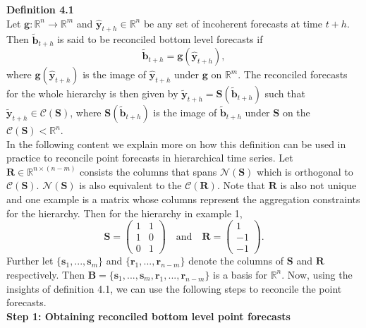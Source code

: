 \documentclass[a4paper, 11pt]{article}
\begin{document}
\noindent
\textbf{Definition 4.1}\\
\noindent
Let $\bm{g}:\bm{\mathbb{R}}^n \rightarrow \bm{\mathbb{R}}^m $ and $\hat{\bm{y}}_{t+h} \in \bm{\mathbb{R}}^n$ be any set of incoherent forecasts at time $t+h$. Then $\tilde{\bm{b}}_{t+h}$ is said to be reconciled bottom level forecasts if 
\begin{equation}
\tilde{\bm{b}}_{t+h}=\bm{g}(\hat{\bm{y}}_{t+h}),
\end{equation}
\noindent
where $\bm{g}(\hat{\bm{y}}_{t+h})$ is the image of $\hat{\bm{y}}_{t+h}$ under $\bm{g}$ on $\bm{\mathbb{R}}^m$. The reconciled forecasts for the whole hierarchy is then given by $\tilde{\bm{y}}_{t+h}=\bm{S}(\tilde{\bm{b}}_{t+h})$ such that $\tilde{\bm{y}}_{t+h} \in \mathscr{C}(\bm{S})$, where $\bm{S}(\tilde{\bm{b}}_{t+h})$ is the image of $\tilde{\bm{b}}_{t+h}$ under $\bm{S}$ on the $\mathscr{C}(\bm{S}) < \bm{\mathbb{R}}^n$.\\

\noindent
In the following content we explain more on how this definition can be used in practice to reconcile point forecasts in hierarchical time series. Let $\bm{R} \in \bm{\mathbb{R}}^{n \times (n-m)}$ consists the columns that spans $\mathscr{N}(\bm{S})$ which is orthogonal to $\mathscr{C}(\bm{S})$. $\mathscr{N}(\bm{S})$ is also equivalent to the $\mathscr{C}(\bm{R})$. Note that $\bm{R}$ is also not unique and one example is a matrix whose columns represent the aggregation constraints for the hierarchy. Then for the hierarchy in example 1, $$ \mathbold{S} = \begin{pmatrix} 1& 1 \\ 1 & 0 \\ 0&1 \end{pmatrix} \quad \text{and} \quad \mathbold{R} = \begin{pmatrix}  1 \\ -1 \\ -1 \end{pmatrix}.$$ 
\noindent
Further let $\{\bm{s}_1,...,\bm{s}_m\}$ and $\{\bm{r}_1,...,\bm{r}_{n-m}\}$ denote the columns of $\bm{S}$ and $\bm{R}$ respectively. Then $\bm{B}=\{\bm{s}_1,...,\bm{s}_m, \bm{r}_1,...,\bm{r}_{n-m}\}$ is a basis for $\bm{\mathbb{R}}^n$. Now, using the insights of definition 4.1, we can use the following steps to reconcile the point forecasts.\\

\noindent
\textbf{Step 1: Obtaining reconciled bottom level point forecasts}\\
\end{document}
